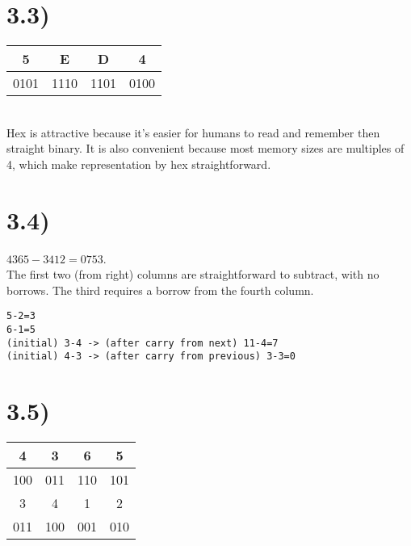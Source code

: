 \documentclass[a4paper,11pt]{article}
\begin{document}

\section*{3.3)} 

\begin{tabular}{| c | c | c | c | }
  \hline			
  5 & E & D & 4  \\
  \hline
  0101 & 1110 & 1101 & 0100  \\
  \hline  
\end{tabular} \\

Hex is attractive because it's easier for humans to read and remember then straight binary.  It is also convenient because
most memory sizes are multiples of 4, which make representation by hex straightforward.


\section*{3.4)} 

$4365 - 3412 = 0753$.   \\
The first two (from right) columns are straightforward to subtract, with no borrows.  The third requires a borrow from the fourth column.

\begin{verbatim}
5-2=3
6-1=5
(initial) 3-4 -> (after carry from next) 11-4=7
(initial) 4-3 -> (after carry from previous) 3-3=0
\end{verbatim}


\section*{3.5)} 

\begin{tabular}{| c | c | c | c | }
  \hline			
  4 & 3 & 6 & 5  \\
  \hline
  100 & 011 & 110 & 101  \\
  \hline  
   \hline			
  3 & 4 & 1 & 2  \\
  \hline
  011 & 100 & 001 & 010  \\
  \hline  
\end{tabular} \\
\end{document}
